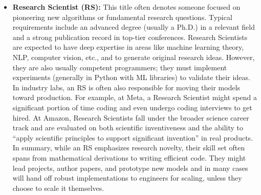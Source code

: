 \documentclass[pdflatex,sn-mathphys-num]{sn-jnl}%
\theoremstyle{thmstyleone}%
\theoremstyle{thmstyletwo}%
\theoremstyle{thmstylethree}%
\begin{document}
\begin{itemize}
\item \textbf{Research Scientist (RS):} This title often denotes someone focused on pioneering new algorithms or fundamental research questions. Typical requirements include an advanced degree (usually a Ph.D.) in a relevant field and a strong publication record in top-tier conferences. Research Scientists are expected to have deep expertise in areas like machine learning theory, NLP, computer vision, etc., and to generate original research ideas. However, they are also usually competent programmers; they must implement experiments (generally in Python with ML libraries) to validate their ideas. In industry labs, an RS is often also responsible for moving their models toward production. For example, at Meta, a Research Scientist might spend a significant portion of time coding and even undergo coding interviews to get hired\cite{Lakshman2025-MetaRS}. At Amazon, Research Scientists fall under the broader science career track and are evaluated on both scientific inventiveness and the ability to “apply scientific principles to support significant invention” in real products\cite{Zeng2022-AmazonCareer}. In summary, while an RS emphasizes research novelty, their skill set often spans from mathematical derivations to writing efficient code. They might lead projects, author papers, and prototype new models and in many cases will hand off robust implementations to engineers for scaling, unless they choose to scale it themselves. 


\end{itemize}
\end{document}
